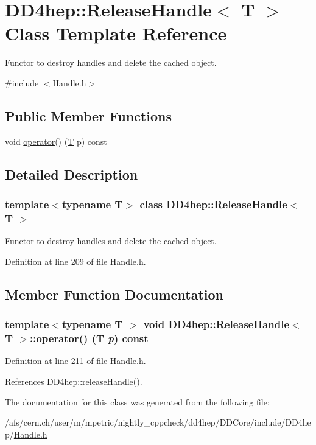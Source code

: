 \hypertarget{class_d_d4hep_1_1_release_handle}{
\section{DD4hep::ReleaseHandle$<$ T $>$ Class Template Reference}
\label{class_d_d4hep_1_1_release_handle}
}


Functor to destroy handles and delete the cached object.  


{\ttfamily \#include $<$Handle.h$>$}\subsection*{Public Member Functions}
\begin{DoxyCompactItemize}
\item 
void \hyperlink{class_d_d4hep_1_1_release_handle_a1bdc9ab47f68219f00e0f8f13e433397}{operator()} (\hyperlink{class_t}{T} p) const 
\end{DoxyCompactItemize}


\subsection{Detailed Description}
\subsubsection*{template$<$typename T$>$ class DD4hep::ReleaseHandle$<$ T $>$}

Functor to destroy handles and delete the cached object. 

Definition at line 209 of file Handle.h.

\subsection{Member Function Documentation}
\hypertarget{class_d_d4hep_1_1_release_handle_a1bdc9ab47f68219f00e0f8f13e433397}{
\subsubsection[{operator()}]{\setlength{\rightskip}{0pt plus 5cm}template$<$typename T $>$ void {\bf DD4hep::ReleaseHandle}$<$ {\bf T} $>$::operator() ({\bf T} {\em p}) const}}
\label{class_d_d4hep_1_1_release_handle_a1bdc9ab47f68219f00e0f8f13e433397}


Definition at line 211 of file Handle.h.

References DD4hep::releaseHandle().

The documentation for this class was generated from the following file:\begin{DoxyCompactItemize}
\item 
/afs/cern.ch/user/m/mpetric/nightly\_\-cppcheck/dd4hep/DDCore/include/DD4hep/\hyperlink{_handle_8h}{Handle.h}\end{DoxyCompactItemize}

